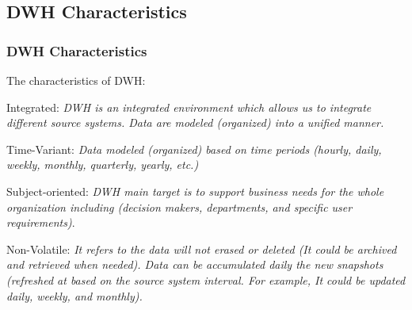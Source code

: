 \subsection{DWH Characteristics}
\begin{frame}
\frametitle{DWH Characteristics}
\begin{wideitemize}
\item The characteristics of DWH:
	\begin{wideitemize}
		\item Integrated: \textit{DWH is an integrated environment which allows us to integrate different source systems. Data are modeled (organized) into a unified manner.} %
	
		\item Time-Variant: \textit{Data modeled (organized) based on time periods (hourly, daily, weekly, monthly, quarterly, yearly, etc.)}
	
		\item Subject-oriented: \textit{DWH main target is to support business needs for the whole organization including (decision makers, departments, and specific user requirements)}.
	
		\item Non-Volatile: \textit{It refers to the data will not erased or deleted (It could be archived and retrieved when needed). Data can be accumulated daily the new snapshots (refreshed at based on the source system interval. For example, It could be updated daily, weekly, and monthly).}
	\end{wideitemize}	
\end{wideitemize}

\end{frame}

